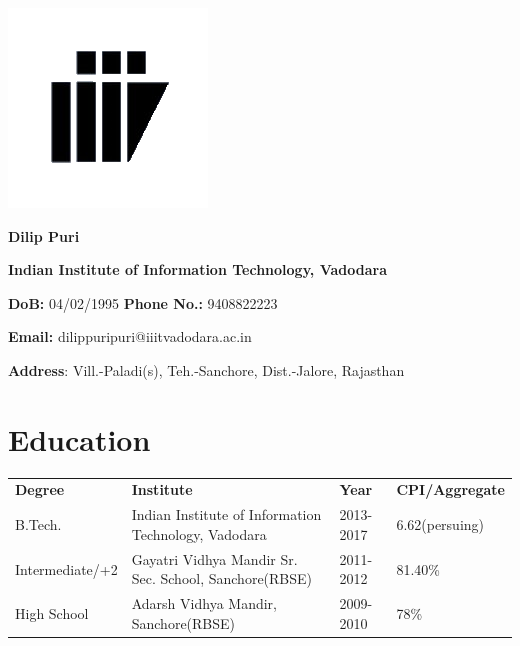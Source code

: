 \documentclass{article}
\begin{document}
\begin{minipage}{.1\textwidth}
\includegraphics[scale=0.6]{logo_iiitv.png}
\end{minipage}%
\begin{minipage}{1.5\textwidth}
\begin{large}
\hspace*{4cm}\textbf{Dilip Puri}\vspace*{2mm}

\hspace*{4cm}\textbf{Indian Institute of Information Technology, Vadodara}\vspace*{2mm}

\hspace*{4cm}\textbf{DoB:} 04/02/1995 \textbf{Phone No.:} 9408822223\vspace*{2mm}

\hspace*{4cm}\textbf{Email:} dilippuripuri@iiitvadodara.ac.in\vspace*{2mm}

\hspace*{4cm}\textbf{Address}: Vill.-Paladi(s), Teh.-Sanchore, Dist.-Jalore, Rajasthan
\end{large}    
\end{minipage}

\section{Education}
\vspace*{2mm}
\begin{tabular}{llll}
\textbf{Degree}&\textbf{Institute}&\textbf{Year}&\textbf{CPI/Aggregate}\vspace*{1mm} \\
B.Tech.& Indian Institute of Information Technology, Vadodara & 2013-2017 & 6.62(persuing)\\
Intermediate/+2 & Gayatri Vidhya Mandir Sr. Sec. School, Sanchore(RBSE) & 2011-2012 & 81.40\%\\
High School & Adarsh Vidhya Mandir, Sanchore(RBSE) & 2009-2010 & 78\%\\
\end{tabular}
\end{document}
